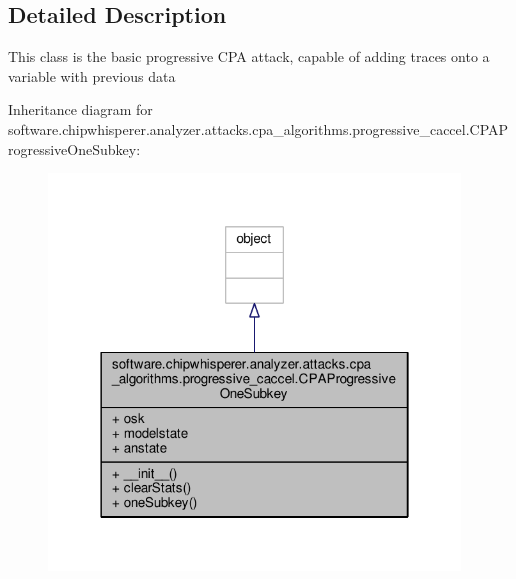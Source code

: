 \subsection{Detailed Description}
\begin{DoxyVerb}This class is the basic progressive CPA attack, capable of adding traces onto a variable with previous data\end{DoxyVerb}
 

Inheritance diagram for software.\+chipwhisperer.\+analyzer.\+attacks.\+cpa\+\_\+algorithms.\+progressive\+\_\+caccel.\+C\+P\+A\+Progressive\+One\+Subkey\+:\nopagebreak
\begin{figure}[H]
\begin{center}
\leavevmode
\includegraphics[width=310pt]{d3/dda/classsoftware_1_1chipwhisperer_1_1analyzer_1_1attacks_1_1cpa__algorithms_1_1progressive__caccel_f73c960f22474ba9a5a584f2eeee62a2}
\end{center}
\end{figure}


